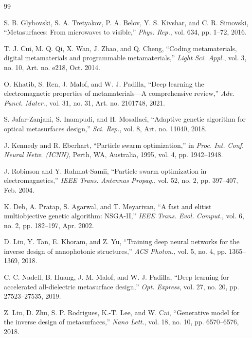 \documentclass[journal]{IEEEtran}
\begin{document}
\begin{thebibliography}{99}
\footnotesize

 S. B. Glybovski, S. A. Tretyakov, P. A. Belov, Y. S. Kivshar, and C. R. Simovski, ``Metasurfaces: From microwaves to visible,'' \textit{Phys. Rep.}, vol. 634, pp. 1--72, 2016.

 T. J. Cui, M. Q. Qi, X. Wan, J. Zhao, and Q. Cheng, ``Coding metamaterials, digital metamaterials and programmable metamaterials,'' \textit{Light Sci. Appl.}, vol. 3, no. 10, Art. no. e218, Oct. 2014.

 O. Khatib, S. Ren, J. Malof, and W. J. Padilla, ``Deep learning the electromagnetic properties of metamaterials---A comprehensive review,'' \textit{Adv. Funct. Mater.}, vol. 31, no. 31, Art. no. 2101748, 2021.

 S. Jafar-Zanjani, S. Inampudi, and H. Mosallaei, ``Adaptive genetic algorithm for optical metasurfaces design,'' \textit{Sci. Rep.}, vol. 8, Art. no. 11040, 2018.

 J. Kennedy and R. Eberhart, ``Particle swarm optimization,'' in \textit{Proc. Int. Conf. Neural Netw. (ICNN)}, Perth, WA, Australia, 1995, vol. 4, pp. 1942--1948.

 J. Robinson and Y. Rahmat-Samii, ``Particle swarm optimization in electromagnetics,'' \textit{IEEE Trans. Antennas Propag.}, vol. 52, no. 2, pp. 397--407, Feb. 2004.

 K. Deb, A. Pratap, S. Agarwal, and T. Meyarivan, ``A fast and elitist multiobjective genetic algorithm: NSGA-II,'' \textit{IEEE Trans. Evol. Comput.}, vol. 6, no. 2, pp. 182--197, Apr. 2002.

 D. Liu, Y. Tan, E. Khoram, and Z. Yu, ``Training deep neural networks for the inverse design of nanophotonic structures,'' \textit{ACS Photon.}, vol. 5, no. 4, pp. 1365--1369, 2018.

 C. C. Nadell, B. Huang, J. M. Malof, and W. J. Padilla, ``Deep learning for accelerated all-dielectric metasurface design,'' \textit{Opt. Express}, vol. 27, no. 20, pp. 27523--27535, 2019.

 Z. Liu, D. Zhu, S. P. Rodrigues, K.-T. Lee, and W. Cai, ``Generative model for the inverse design of metasurfaces,'' \textit{Nano Lett.}, vol. 18, no. 10, pp. 6570--6576, 2018.


\end{thebibliography}
\end{document}
